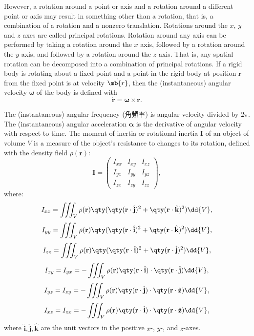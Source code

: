 \documentclass[a4paper,12pt]{article}
\begin{document}
However, a rotation around a point or axis and a rotation around a different point or axis may result in something other than a rotation, that is, a  combination of a rotation and a nonzero translation.
Rotations around the $x$, $y$ and $z$ axes are called principal rotations. Rotation around any axis can be performed by taking a rotation around the $x$ axis, followed by a rotation around the $y$ axis, and followed by a rotation around the $z$ axis. That is, any spatial rotation can be decomposed into a combination of principal rotations.
If a rigid body is rotating about a fixed point and a point in the rigid body at position $\mathbf{r}$ from the fixed point is at velocity $\dot{\mb{r}}$, then the (instantaneous) angular velocity $\boldsymbol{\omega}$ of the body is defined with
\[\dot{\mathbf{r}}=\boldsymbol{\omega}\times\mathbf{r}.\]

The (instantaneous) angular frequency (角頻率) is angular velocity divided by $2\pi$.
The (instantaneous) angular acceleration $\boldsymbol{\alpha}$ is the derivative of angular velocity with respect to time.
The moment of inertia or rotational inertia $\mathbf{I}$ of an object of volume $V$ is a measure of the object's resistance to changes to its rotation, defined with the density field $\rho(\mathbf{r})$:
\[\mathbf{I}=\begin{pmatrix}
    I_{xx} & I_{xy} & I_{xz}\\
    I_{yx} & I_{yy} & I_{yz}\\
    I_{zx} & I_{zy} & I_{zz}
\end{pmatrix},\]
where:
\[I_{xx}=\iiint_V\rho(\mathbf{r})\qty(\qty(\mathbf{r}\cdot\hat{\mathbf{j}})^2+\qty(\mathbf{r}\cdot\hat{\mathbf{k}})^2)\dd{V},\]
\[I_{yy}=\iiint_V\rho(\mathbf{r})\qty(\qty(\mathbf{r}\cdot\hat{\mathbf{i}})^2+\qty(\mathbf{r}\cdot\hat{\mathbf{k}})^2)\dd{V},\]
\[I_{zz}=\iiint_V\rho(\mathbf{r})\qty(\qty(\mathbf{r}\cdot\hat{\mathbf{i}})^2+\qty(\mathbf{r}\cdot\hat{\mathbf{j}})^2)\dd{V},\]
\[I_{xy}=I_{yx}=-\iiint_V\rho(\mathbf{r})\qty(\mathbf{r}\cdot\hat{\mathbf{i}})\cdot\qty(\mathbf{r}\cdot\hat{\mathbf{j}})\dd{V},\]
\[I_{yz}=I_{zy}=-\iiint_V\rho(\mathbf{r})\qty(\mathbf{r}\cdot\hat{\mathbf{j}})\cdot\qty(\mathbf{r}\cdot\hat{\mathbf{z}})\dd{V},\]
\[I_{xz}=I_{zx}=-\iiint_V\rho(\mathbf{r})\qty(\mathbf{r}\cdot\hat{\mathbf{i}})\cdot\qty(\mathbf{r}\cdot\hat{\mathbf{z}})\dd{V},\]
where $\hat{\mathbf{i}},\hat{\mathbf{j}},\hat{\mathbf{k}}$ are the unit vectors in the positive $x$-, $y$-, and $z$-axes.
\end{document}
